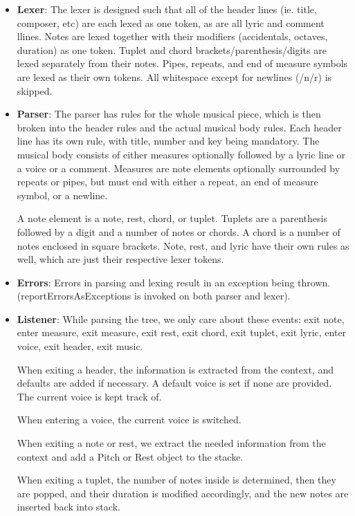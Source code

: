 \documentclass[12pt]{book}
\begin{document}
\begin{itemize}
\item {\bf Lexer}: The lexer is designed such that all of the header lines (ie. title, composer, etc) are each lexed as one token, as are all lyric and comment llines. Notes are lexed together with their modifiers (accidentals, octaves, duration) as one token. Tuplet and chord brackets/parenthesis/digits are lexed separately from their notes. Pipes, repeats, and end of measure symbols are lexed as their own tokens. All whitespace except for newlines (/n/r) is skipped.

\item {\bf Parser}: The parser has rules for the whole musical piece, which is then broken into the header rules and the actual musical body rules. Each header line has its own rule, with title, number and key being mandatory. The musical body consists of either measures optionally followed by a lyric line or a voice or a comment. Measures are note elements optionally surrounded by repeats or pipes, but must end with either a repeat, an end of measure symbol, or a newline. 

A note element is a note, rest, chord, or tuplet. Tuplets are a parenthesis followed by a digit and a number of notes or chords. A chord is a number of notes enclosed in square brackets. Note, rest, and lyric have their own rules as well, which are just their respective lexer tokens.

\item {\bf Errors}: Errors in parsing and lexing result in an exception being thrown. (reportErrorsAsExceptions is invoked on both parser and lexer).

\item {\bf Listener}: While parsing the tree, we only care about these events: exit note, enter measure, exit measure, exit rest, exit chord, exit tuplet, exit lyric, enter voice, exit header, exit music.

When exiting a header, the information is extracted from the context, and defaults are added if necessary. A default voice is set if none are provided. The current voice is kept track of.

When entering a voice, the current voice is switched.

When exiting a note or rest, we extract the needed information from the context and add a Pitch or Rest object to the stacke. 

When exiting a tuplet, the number of notes inside is determined, then they are popped, and their duration is modified accordingly, and the new notes are inserted back into stack.


\end{itemize}
\end{document}
